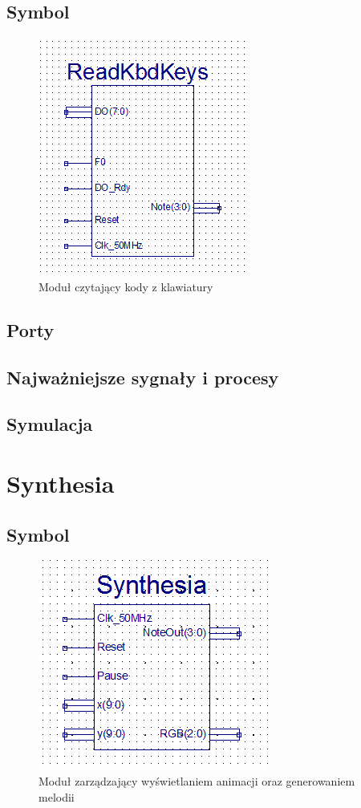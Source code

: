 \documentclass[a4paper]{report}
\begin{document}
		\subsection{Symbol}
			\begin{figure}[h!]
				\centering				
				\includegraphics{readkbdkeys2.png}
				\caption{Moduł czytający kody z klawiatury}
			\end{figure}
		\subsection{Porty}
			
		\subsection{Najważniejsze sygnały i procesy}
		\subsection{Symulacja}
		\newpage
	\section{Synthesia}
		\subsection{Symbol}
			\begin{figure}[h!]
				\centering
				\includegraphics{synthesia2.png}
				\caption{Moduł zarządzający wyświetlaniem animacji oraz generowaniem melodii}
			\end{figure}
\end{document}
